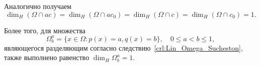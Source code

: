 Аналогично получаем
\begin{equation}
	\dim_H (\Omega \cap ac) = \dim_H (\Omega \cap ac_0) = \dim_H (\Omega \cap c) = \dim_H (\Omega \cap c_0) = 1
	.
\end{equation}

Более того, для множества
\begin{equation}
	\Omega^a_b = \{x\in\Omega : p(x) = a, q(x) = b\}
	,
	\quad 0 \leq a < b \leq 1
	,
\end{equation}
являющегося разделяющим согласно следствию~\ref{crl:Lin_Omega_Sucheston},
также выполнено равенство $\dim_H \Omega^a_b = 1$.
